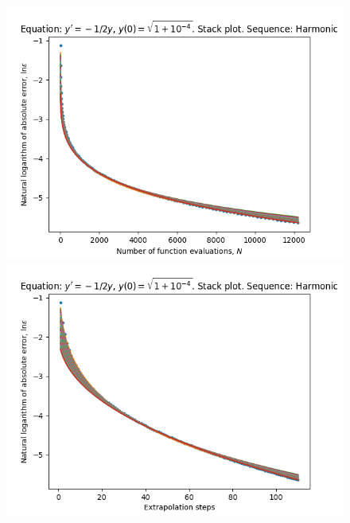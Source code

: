 \begin{figure}[H]
\centering
\begin{minipage}{0.45\textwidth}
\centering
\includegraphics[scale=0.45]{../results/emr_plots/quad_sing_4_hp_harmonic_stack.png}
\end{minipage}
\begin{minipage}{0.45\textwidth}
\centering
\includegraphics[scale=0.45]{../results/emr_plots/quad_sing_4_hp_harmonic_steps_stack.png}
\end{minipage}
\end{figure}

